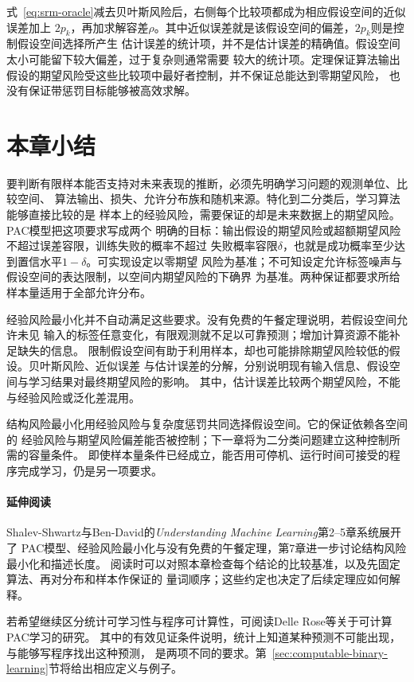 式~\eqref{eq:srm-oracle}减去贝叶斯风险后，右侧每个比较项都成为相应假设空间的近似误差加上
$2p_k$，再加求解容差$\rho$。其中近似误差就是该假设空间的偏差，$2p_k$则是控制假设空间选择所产生
估计误差的统计项，并不是估计误差的精确值。假设空间太小可能留下较大偏差，过于复杂则通常需要
较大的统计项。定理保证算法输出假设的期望风险受这些比较项中最好者控制，并不保证总能达到零期望风险，
也没有保证带惩罚目标能够被高效求解。

\section{本章小结}
\label{sec:statistical-framework-summary}

要判断有限样本能否支持对未来表现的推断，必须先明确学习问题的观测单位、比较空间、
算法输出、损失、允许分布族和随机来源。特化到二分类后，学习算法能够直接比较的是
样本上的经验风险，需要保证的却是未来数据上的期望风险。PAC模型把这项要求写成两个
明确的目标：输出假设的期望风险或超额期望风险不超过误差容限，训练失败的概率不超过
失败概率容限$\delta$，也就是成功概率至少达到置信水平$1-\delta$。可实现设定以零期望
风险为基准；不可知设定允许标签噪声与假设空间的表达限制，以空间内期望风险的下确界
为基准。两种保证都要求所给样本量适用于全部允许分布。

经验风险最小化并不自动满足这些要求。没有免费的午餐定理说明，若假设空间允许未见
输入的标签任意变化，有限观测就不足以可靠预测；增加计算资源不能补足缺失的信息。
限制假设空间有助于利用样本，却也可能排除期望风险较低的假设。贝叶斯风险、近似误差
与估计误差的分解，分别说明现有输入信息、假设空间与学习结果对最终期望风险的影响。
其中，估计误差比较两个期望风险，不能与经验风险或泛化差混用。

结构风险最小化用经验风险与复杂度惩罚共同选择假设空间。它的保证依赖各空间的
经验风险与期望风险偏差能否被控制；下一章将为二分类问题建立这种控制所需的容量条件。
即使样本量条件已经成立，能否用可停机、运行时间可接受的程序完成学习，仍是另一项要求。

\paragraph{延伸阅读}
Shalev-Shwartz与Ben-David的\textit{Understanding Machine Learning}第2--5章系统展开了
PAC模型、经验风险最小化与没有免费的午餐定理，第7章进一步讨论结构风险最小化和描述长度。
阅读时可以对照本章检查每个结论的比较基准，以及先固定算法、再对分布和样本作保证的
量词顺序；这些约定也决定了后续定理应如何解释。

若希望继续区分统计可学习性与程序可计算性，可阅读Delle Rose等关于可计算PAC学习的研究。
其中的有效见证条件说明，统计上知道某种预测不可能出现，与能够写程序找出这种预测，
是两项不同的要求。第~\ref{sec:computable-binary-learning}节将给出相应定义与例子。
